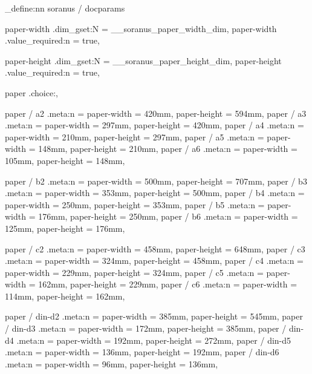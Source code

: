 %
%
%
% 
%

%

\keys_define:nn {soranus / docparams}
  {
    paper-width .dim_gset:N       = \g__soranus_paper_width_dim,
    paper-width .value_required:n = true,

    paper-height .dim_gset:N       = \g__soranus_paper_height_dim,
    paper-height .value_required:n = true,


    paper .choice:,

    paper / a2 .meta:n = {paper-width = 420mm, paper-height = 594mm},
    paper / a3 .meta:n = {paper-width = 297mm, paper-height = 420mm},
    paper / a4 .meta:n = {paper-width = 210mm, paper-height = 297mm},
    paper / a5 .meta:n = {paper-width = 148mm, paper-height = 210mm},
    paper / a6 .meta:n = {paper-width = 105mm, paper-height = 148mm},

    paper / b2 .meta:n = {paper-width = 500mm, paper-height = 707mm},
    paper / b3 .meta:n = {paper-width = 353mm, paper-height = 500mm},
    paper / b4 .meta:n = {paper-width = 250mm, paper-height = 353mm},
    paper / b5 .meta:n = {paper-width = 176mm, paper-height = 250mm},
    paper / b6 .meta:n = {paper-width = 125mm, paper-height = 176mm},

    paper / c2 .meta:n = {paper-width = 458mm, paper-height = 648mm},
    paper / c3 .meta:n = {paper-width = 324mm, paper-height = 458mm},
    paper / c4 .meta:n = {paper-width = 229mm, paper-height = 324mm},
    paper / c5 .meta:n = {paper-width = 162mm, paper-height = 229mm},
    paper / c6 .meta:n = {paper-width = 114mm, paper-height = 162mm},

    paper / din-d2 .meta:n = {paper-width = 385mm, paper-height = 545mm},
    paper / din-d3 .meta:n = {paper-width = 172mm, paper-height = 385mm},
    paper / din-d4 .meta:n = {paper-width = 192mm, paper-height = 272mm},
    paper / din-d5 .meta:n = {paper-width = 136mm, paper-height = 192mm},
    paper / din-d6 .meta:n = {paper-width = 96mm, paper-height = 136mm},

}
